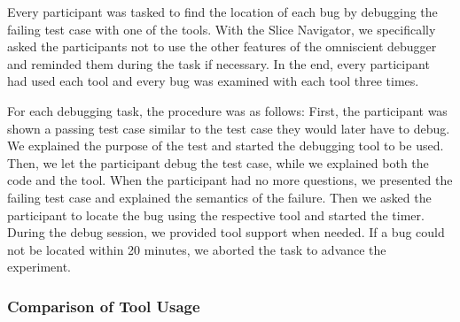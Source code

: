 Every participant was tasked to find the location of each bug by debugging the failing test case with one of the tools.
With the Slice Navigator, we specifically asked the participants not to use the other features of the omniscient debugger and reminded them during the task if necessary.
In the end, every participant had used each tool and every bug was examined with each tool three times.

For each debugging task, the procedure was as follows:
First, the participant was shown a passing test case similar to the test case they would later have to debug.
We explained the purpose of the test and started the debugging tool to be used.
Then, we let the participant debug the test case, while we explained both the code and the tool.
When the participant had no more questions, we presented the failing test case and explained the semantics of the failure.
Then we asked the participant to locate the bug using the respective tool and started the timer.
During the debug session, we provided tool support when needed.
If a bug could not be located within 20 minutes, we aborted the task to advance the experiment.

\subsubsection{Comparison of Tool Usage}

